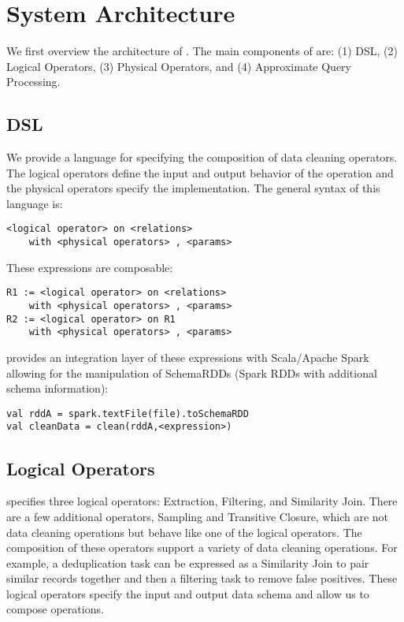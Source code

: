 \section{System Architecture}
We first overview the architecture of \projx.
The main components of \projx are: (1) DSL, (2) Logical Operators, (3) Physical Operators,
and (4) Approximate Query Processing.

\subsection{\projx DSL}
We provide a language for specifying the composition of data cleaning operators.
The logical operators define the input and output behavior of the operation and 
the physical operators specify the implementation.
The general syntax of this language is:
\begin{lstlisting}
<logical operator> on <relations>
	with <physical operators> , <params>
\end{lstlisting}
These expressions are composable:
\begin{lstlisting}
R1 := <logical operator> on <relations> 
	with <physical operators> , <params>
R2 := <logical operator> on R1 
	with <physical operators> , <params>
\end{lstlisting}
\projx provides an integration layer of these expressions with Scala/Apache Spark allowing for the manipulation of SchemaRDDs (Spark RDDs with additional schema information):
\begin{lstlisting}
val rddA = spark.textFile(file).toSchemaRDD
val cleanData = clean(rddA,<expression>)
\end{lstlisting}

\subsection{Logical Operators}
\projx specifies three logical operators: Extraction, Filtering, and Similarity Join. 
There are a few additional operators, Sampling and Transitive Closure, which are not data cleaning operations but behave like
one of the logical operators.
The composition of these operators support a variety of data cleaning
operations. 
For example, a deduplication task can be expressed as a Similarity Join to pair similar records
together and then a filtering task to remove false positives.
These logical operators specify the input and output data schema and allow us to compose operations.


